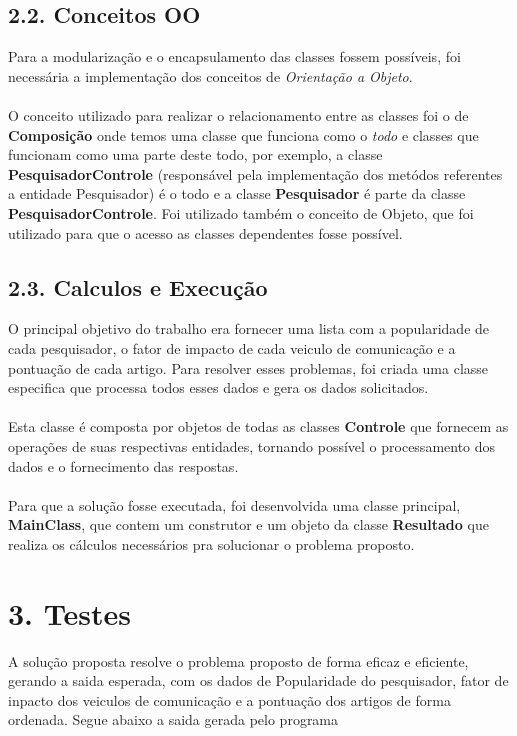 \documentclass[12pt, a4paper]{article}
\begin{document}
  \subsection*{2.2. Conceitos OO}
    Para a modularização e o encapsulamento das classes fossem possíveis, foi necessária a implementação dos conceitos de \textit{Orientação a Objeto}.\\\\
    O conceito utilizado para realizar o relacionamento entre as classes foi o de \textbf{Composição} onde temos uma classe que funciona como o \textit{todo} e classes que funcionam como uma parte deste todo, por exemplo, a classe \textbf{PesquisadorControle} (responsável pela implementação dos metódos referentes a entidade Pesquisador) é o todo e a classe \textbf{Pesquisador} é parte da classe \textbf{PesquisadorControle}.
    Foi utilizado também o conceito de Objeto, que foi utilizado para que o acesso as classes dependentes fosse possível.

  \subsection*{2.3. Calculos e Execução}
    O principal objetivo do trabalho era fornecer uma lista com a popularidade de cada pesquisador, o fator de impacto de cada veiculo de comunicação e a pontuação de cada artigo. Para resolver esses problemas, foi criada uma classe especifica que processa todos esses dados e gera os dados solicitados.\\\\
    Esta classe é composta por objetos de todas as classes \textbf{Controle} que fornecem as operações de suas respectivas entidades, tornando possível o processamento dos dados e o fornecimento das respostas.\\\\
    Para que a solução fosse executada, foi desenvolvida uma classe principal, \textbf{MainClass}, que contem um construtor e um objeto da classe \textbf{Resultado} que realiza os cálculos necessários pra solucionar o problema proposto.



\section*{3. Testes}
A solução proposta resolve o problema proposto de forma eficaz e eficiente, gerando a saida esperada, com os dados de Popularidade do pesquisador, fator de inpacto dos veiculos de comunicação e a pontuação dos artigos de forma ordenada. Segue abaixo a saida gerada pelo programa\\
\end{document}
